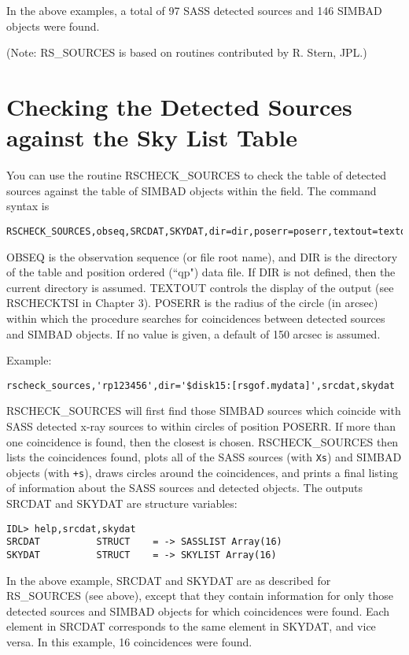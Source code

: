 In the above examples, a total of 97 SASS detected sources and 146 SIMBAD
objects were found.
 
(Note: RS{\_}SOURCES is based on routines contributed by R. Stern, JPL.)
 

\section{Checking the Detected Sources against the Sky List Table}
 
You can use the routine RSCHECK{\_}SOURCES to check the table of detected sources
against the table of SIMBAD objects within the field. The command syntax is

\medskip\noindent
\begin{verbatim}
RSCHECK_SOURCES,obseq,SRCDAT,SKYDAT,dir=dir,poserr=poserr,textout=textout
\end{verbatim}
OBSEQ is the observation sequence (or file root name), and DIR is the directory
of the table and position ordered (``qp") data file. If DIR is not defined, then
the current directory is assumed. TEXTOUT controls the display of the output
(see RSCHECKTSI in Chapter 3). POSERR is the radius of the circle (in arcsec)
within which the procedure searches for coincidences between detected sources
and SIMBAD objects. If no value is given, a default of 150 arcsec is assumed.
 
Example:

\medskip\noindent
\begin{verbatim}
rscheck_sources,'rp123456',dir='$disk15:[rsgof.mydata]',srcdat,skydat
\end{verbatim}
RSCHECK{\_}SOURCES will first find those SIMBAD sources which coincide with SASS
detected x-ray sources to within circles of position POSERR. If more than one
coincidence is found, then the closest is chosen. RSCHECK{\_}SOURCES then lists
the coincidences found, plots all of the SASS sources (with {\tt Xs}) and SIMBAD
objects (with {\tt +s}), draws circles around the coincidences, and prints a final
listing of information about the SASS sources and detected objects. The outputs
SRCDAT and SKYDAT are structure variables:

\medskip\noindent
\begin{verbatim}
IDL> help,srcdat,skydat
SRCDAT          STRUCT    = -> SASSLIST Array(16)
SKYDAT          STRUCT    = -> SKYLIST Array(16)
\end{verbatim}
In the above example, SRCDAT and SKYDAT are as described for RS{\_}SOURCES (see
above), except that they contain information for only those detected sources
and SIMBAD objects for which coincidences were found. Each element in SRCDAT
corresponds to the same element in SKYDAT, and vice versa. In this example, 16
coincidences were found.
 
